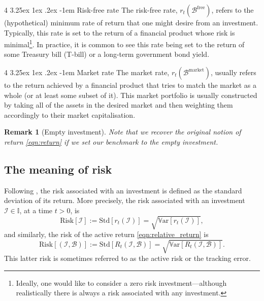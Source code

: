 \documentclass[12pt]{article}
\makeatletter
\newtheorem{remark}{Remark}[section]
\renewcommand\paragraph{%
	\@startsection{paragraph}
	{4}
	{\z@}
	{3.25ex \@plus1ex \@minus.2ex}
	{-1em}
	{\normalfont\normalsize\bfseries\maybe@addperiod}%
}
\newcommand{\maybe@addperiod}[1]{%
	#1\@addpunct{.}%
}
\makeatother
\begin{document}
\paragraph{Risk-free rate} The risk-free rate, $r_t(\mathcal{B}^{\text{free}})$, refers to the (hypothetical) minimum rate of return that one might desire from an investment. Typically, this rate is set to the return of a financial product whose risk is minimal\footnote{Ideally, one would like to consider a zero risk investment---although realistically there is always a risk associated with any investment.}. In practice, it is common to see this rate being set to the return of some Treasury bill (T-bill) or a long-term government bond yield.

\paragraph{Market rate} The market rate, $r_t(\mathcal{B}^{\text{market}})$, usually refers to the return achieved by a financial product that tries to match the market as a whole (or at least some subset of it). This market portfolio is usually constructed by taking all of the assets in the desired market and then weighting them accordingly to their market capitalisation.

\begin{remark}
	[Empty investment] Note that we recover the original notion of return \eqref{eqn:return} if we set our benchmark to the empty investment.
\end{remark}
\subsection{The meaning of risk}
Following \cite{grinold1999}, the risk associated with an investment is defined as the standard deviation of its return. More precisely, the risk associated with an investment $\mathcal{I} \in \mathbb{I}$, at a time $t > 0$, is
\begin{equation}
	\text{Risk}[\mathcal{I}] := \text{Std}[r_t(\mathcal{I})] = \sqrt{\mathbb{V}\text{ar}[r_t(\mathcal{I})]},
\end{equation}
and similarly, the risk of the active return \eqref{eqn:relative_return} is 
\begin{equation}
	\text{Risk}[(\mathcal{I}, \mathcal{B})] := \text{Std}[R_t(\mathcal{I}, \mathcal{B})] = \sqrt{\mathbb{V}\text{ar}[R_t(\mathcal{I}, \mathcal{B})]}.
\end{equation}
This latter risk is sometimes referred to as the active risk or the tracking error.
\end{document}
